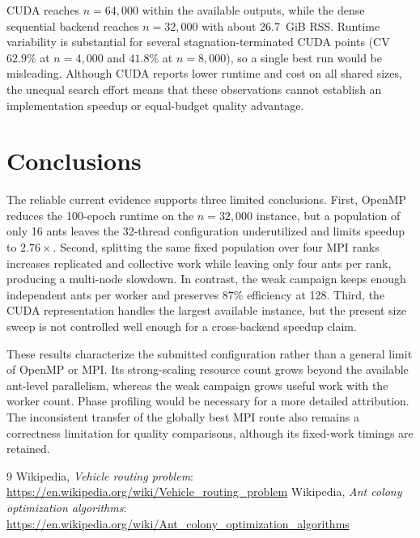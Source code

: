 CUDA reaches $n=64{,}000$ within the available outputs, while the dense sequential backend reaches $n=32{,}000$ with about 26.7~GiB RSS.  Runtime variability is substantial for several stagnation-terminated CUDA points (CV $62.9\%$ at $n=4{,}000$ and $41.8\%$ at $n=8{,}000$), so a single best run would be misleading.  Although CUDA reports lower runtime and cost on all shared sizes, the unequal search effort means that these observations cannot establish an implementation speedup or equal-budget quality advantage.

\section{Conclusions}

The reliable current evidence supports three limited conclusions.  First, OpenMP reduces the 100-epoch runtime on the $n=32{,}000$ instance, but a population of only 16 ants leaves the 32-thread configuration underutilized and limits speedup to $2.76\times$.  Second, splitting the same fixed population over four MPI ranks increases replicated and collective work while leaving only four ants per rank, producing a multi-node slowdown.  In contrast, the weak campaign keeps enough independent ants per worker and preserves $87\%$ efficiency at 128.  Third, the CUDA representation handles the largest available instance, but the present size sweep is not controlled well enough for a cross-backend speedup claim.

These results characterize the submitted configuration rather than a general limit of OpenMP or MPI.  Its strong-scaling resource count grows beyond the available ant-level parallelism, whereas the weak campaign grows useful work with the worker count.  Phase profiling would be necessary for a more detailed attribution.  The inconsistent transfer of the globally best MPI route also remains a correctness limitation for quality comparisons, although its fixed-work timings are retained.

\vspace{-0.75\baselineskip}
{\small
\begin{thebibliography}{9}
 Wikipedia, \emph{Vehicle routing problem}: \url{https://en.wikipedia.org/wiki/Vehicle_routing_problem}
 Wikipedia, \emph{Ant colony optimization algorithms}: \url{https://en.wikipedia.org/wiki/Ant_colony_optimization_algorithms}
\end{thebibliography}
}

